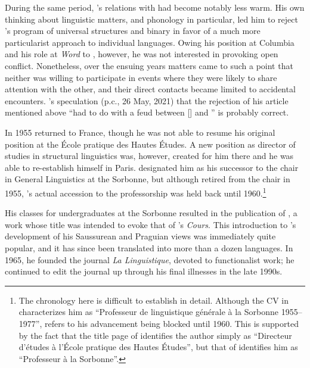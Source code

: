 During the same period, {\Martinet}'s relations with {\Jakobson} had become
notably less warm. His own thinking about linguistic matters, and
phonology in particular, led him to reject {\Jakobson}'s program of
universal structures and binary  in favor of a much more
particularist approach to individual languages. Owing his position at
Columbia and his role at \textsl{Word} to {\Jakobson}, however, he was
not interested in provoking open conflict. Nonetheless, over the
ensuing years matters came to such a point that neither was willing to
participate in events where they were likely to share attention with
the other, and their direct contacts became limited to accidental
encounters.  {\Chomsky}'s speculation (p.c., 26 May, 2021) that the
rejection of his article mentioned above ``had to do with a feud
between [{\Martinet}] and {\Jakobson}'' is probably correct.

In 1955 {\Martinet} returned to France, though he was not able to resume
his original position at the École pratique des Hautes Études. A new
position as director of studies in structural linguistics was,
however, created for him there and he was able to re-establish himself
in Paris.  designated him as his successor to the chair
in General Linguistics at the Sorbonne, but although {\Lejeune} retired
from the chair in 1955, {\Martinet}'s actual accession to the
professorship was held back until 1960.\footnote{The chronology here
  is difficult to establish in detail. Although the CV in
  \citealt[365f.]{martinet93:memoires} characterizes him as
  ``Professeur de linguistique générale à la Sorbonne 1955--1977'',
  \citet[79]{martinet93:memoires} refers to his advancement being
  blocked until 1960. This is supported by the fact that the title
  page of \citealt{martinet56:description} identifies the author
  simply as ``Directeur d'études à l'École pratique des Hautes
  Études'', but that of \citealt{martinet60:elements} identifies him
  as ``Professeur à la Sorbonne''.}

His classes for undergraduates at the Sorbonne resulted in the
publication of \citealt{martinet60:elements}, a work whose title was
intended to evoke that of {\Saussure}'s \textsl{Cours}. This introduction
to {\Martinet}'s development of his Saussurean and Praguian views was
immediately quite popular, and it has since been translated into more
than a dozen languages.  In 1965, he founded the journal \textsl{La
  Linguistique}, devoted to functionalist work; he continued to edit
the journal up through his final illnesses in the late 1990s.

